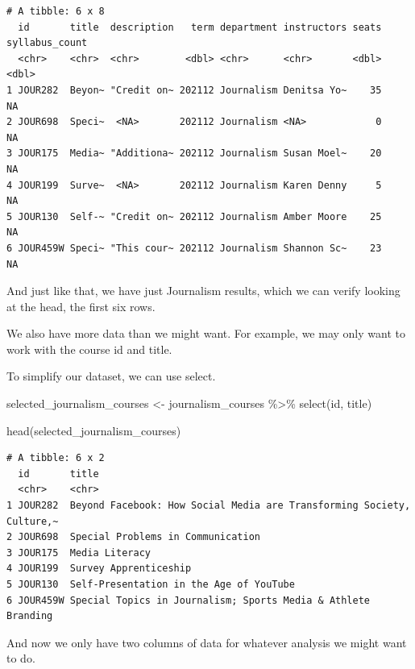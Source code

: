 \documentclass[
  letterpaper,
  DIV=11,
  numbers=noendperiod]{scrreprt}
\newenvironment{Shaded}{\begin{snugshade}}{\end{snugshade}}
\newcommand{\FunctionTok}[1]{\textcolor[rgb]{0.28,0.35,0.67}{#1}}
\newcommand{\NormalTok}[1]{\textcolor[rgb]{0.00,0.23,0.31}{#1}}
\newcommand{\OtherTok}[1]{\textcolor[rgb]{0.00,0.23,0.31}{#1}}
\newcommand{\SpecialCharTok}[1]{\textcolor[rgb]{0.37,0.37,0.37}{#1}}
\begin{document}
\begin{verbatim}
# A tibble: 6 x 8
  id       title  description   term department instructors seats syllabus_count
  <chr>    <chr>  <chr>        <dbl> <chr>      <chr>       <dbl>          <dbl>
1 JOUR282  Beyon~ "Credit on~ 202112 Journalism Denitsa Yo~    35             NA
2 JOUR698  Speci~  <NA>       202112 Journalism <NA>            0             NA
3 JOUR175  Media~ "Additiona~ 202112 Journalism Susan Moel~    20             NA
4 JOUR199  Surve~  <NA>       202112 Journalism Karen Denny     5             NA
5 JOUR130  Self-~ "Credit on~ 202112 Journalism Amber Moore    25             NA
6 JOUR459W Speci~ "This cour~ 202112 Journalism Shannon Sc~    23             NA
\end{verbatim}

And just like that, we have just Journalism results, which we can verify
looking at the head, the first six rows.

We also have more data than we might want. For example, we may only want
to work with the course id and title.

To simplify our dataset, we can use select.

\begin{Shaded}
\begin{Highlighting}[]
\NormalTok{selected\_journalism\_courses }\OtherTok{\textless{}{-}}\NormalTok{ journalism\_courses }\SpecialCharTok{\%\textgreater{}\%} \FunctionTok{select}\NormalTok{(id, title)}

\FunctionTok{head}\NormalTok{(selected\_journalism\_courses)}
\end{Highlighting}
\end{Shaded}

\begin{verbatim}
# A tibble: 6 x 2
  id       title                                                                
  <chr>    <chr>                                                                
1 JOUR282  Beyond Facebook: How Social Media are Transforming Society, Culture,~
2 JOUR698  Special Problems in Communication                                    
3 JOUR175  Media Literacy                                                       
4 JOUR199  Survey Apprenticeship                                                
5 JOUR130  Self-Presentation in the Age of YouTube                              
6 JOUR459W Special Topics in Journalism; Sports Media & Athlete Branding        
\end{verbatim}

And now we only have two columns of data for whatever analysis we might
want to do.
\end{document}
